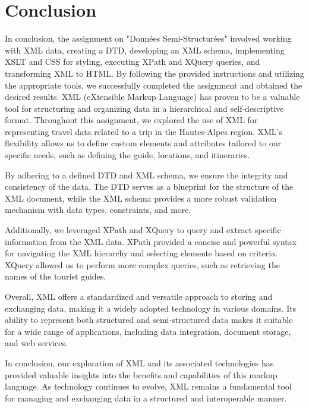 \documentclass[12pt]{report}
\begin{document}
\section{Conclusion}
In conclusion, the assignment on "Données Semi-Structurées" involved working with XML data, creating a DTD, developing an XML schema, implementing XSLT and CSS for styling, executing XPath and XQuery queries, and transforming XML to HTML. By following the provided instructions and utilizing the appropriate tools, we successfully completed the assignment and obtained the desired results.
XML (eXtensible Markup Language) has proven to be a valuable tool for structuring and organizing data in a hierarchical and self-descriptive format. Throughout this assignment, we explored the use of XML for representing travel data related to a trip in the Hautes-Alpes region. XML's flexibility allows us to define custom elements and attributes tailored to our specific needs, such as defining the guide, locations, and itineraries.

By adhering to a defined DTD and XML schema, we ensure the integrity and consistency of the data. The DTD serves as a blueprint for the structure of the XML document, while the XML schema provides a more robust validation mechanism with data types, constraints, and more.

Additionally, we leveraged XPath and XQuery to query and extract specific information from the XML data. XPath provided a concise and powerful syntax for navigating the XML hierarchy and selecting elements based on criteria. XQuery allowed us to perform more complex queries, such as retrieving the names of the tourist guides.

Overall, XML offers a standardized and versatile approach to storing and exchanging data, making it a widely adopted technology in various domains. Its ability to represent both structured and semi-structured data makes it suitable for a wide range of applications, including data integration, document storage, and web services.

In conclusion, our exploration of XML and its associated technologies has provided valuable insights into the benefits and capabilities of this markup language. As technology continues to evolve, XML remains a fundamental tool for managing and exchanging data in a structured and interoperable manner.
\end{document}
